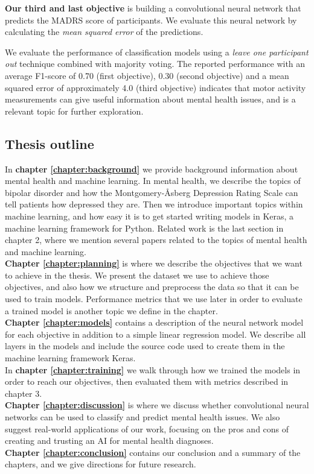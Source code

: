 \textbf{Our third and last objective} is building a convolutional neural network that predicts the MADRS score of participants. We evaluate this neural network by calculating the \textit{mean squared error} of the predictions.

We evaluate the performance of classification models using a \textit{leave one participant out} technique combined with majority voting. The reported performance with an average F1-score of 0.70 (first objective), 0.30 (second objective) and a mean squared error of approximately 4.0 (third objective) indicates that motor activity measurements can give useful information about mental health issues, and is a relevant topic for further exploration.

\subsection{Thesis outline}
In \textbf{chapter \ref{chapter:background}} we provide background information about mental health and machine learning. In mental health, we describe the topics of bipolar disorder and how the Montgomery-Åsberg Depression Rating Scale can tell patients how depressed they are. Then we introduce important topics within machine learning, and how easy it is to get started writing models in Keras, a machine learning framework for Python. Related work is the last section in chapter 2, where we mention several papers related to the topics of mental health and machine learning. \\

\noindent \textbf{Chapter \ref{chapter:planning}} is where we describe the objectives that we want to achieve in the thesis. We present the dataset we use to achieve those objectives, and also how we structure and preprocess the data so that it can be used to train models. Performance metrics that we use later in order to evaluate a trained model is another topic we define in the chapter.\\

\noindent \textbf{Chapter \ref{chapter:models}} contains a description of the neural network model for each objective in addition to a simple linear regression model. We describe all layers in the models and include the source code used to create them in the machine learning framework Keras. \\

\noindent In \textbf{chapter \ref{chapter:training}} we walk through how we trained the models in order to reach our objectives, then evaluated them with metrics described in chapter 3. \\

\noindent \textbf{Chapter \ref{chapter:discussion}} is where we discuss whether convolutional neural networks can be used to classify and predict mental health issues. We also suggest real-world applications of our work, focusing on the pros and cons of creating and trusting an AI for mental health diagnoses. \\

\noindent \textbf{Chapter \ref{chapter:conclusion}} contains our conclusion and a summary of the chapters, and we give directions for future research.


